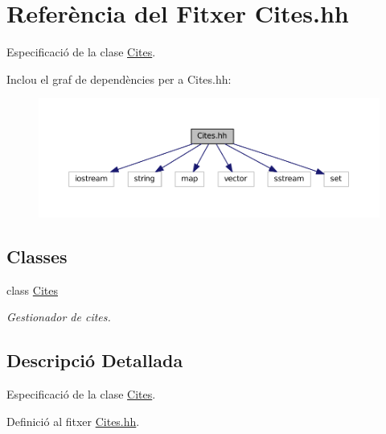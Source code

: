 \hypertarget{_cites_8hh}{\section{Referència del Fitxer Cites.\+hh}
\label{_cites_8hh}
}


Especificació de la clase \hyperlink{class_cites}{Cites}.  


Inclou el graf de dependències per a Cites.\+hh\+:\nopagebreak
\begin{figure}[H]
\begin{center}
\leavevmode
\includegraphics[width=350pt]{_cites_8hh__incl}
\end{center}
\end{figure}
\subsection*{Classes}
\begin{DoxyCompactItemize}
\item 
class \hyperlink{class_cites}{Cites}
\begin{DoxyCompactList}\small\item\em Gestionador de cites. \end{DoxyCompactList}\end{DoxyCompactItemize}


\subsection{Descripció Detallada}
Especificació de la clase \hyperlink{class_cites}{Cites}. 



Definició al fitxer \hyperlink{_cites_8hh_source}{Cites.\+hh}.

